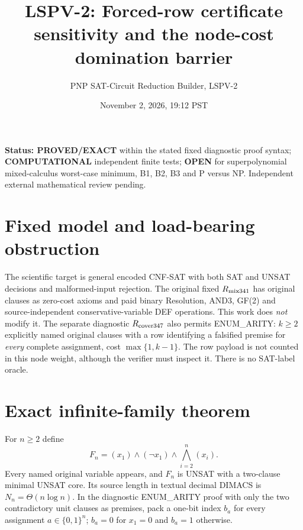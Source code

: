 \documentclass[11pt]{article}
\title{LSPV-2: Forced-row certificate sensitivity and the node-cost domination barrier}
\author{PNP SAT-Circuit Reduction Builder, LSPV-2}
\date{November 2, 2026, 19:12 PST}
\begin{document}
\maketitle
\noindent\textbf{Status: PROVED/EXACT} within the stated fixed diagnostic proof syntax; \textbf{COMPUTATIONAL} independent finite tests; \textbf{OPEN} for superpolynomial mixed-calculus worst-case minimum, B1, B2, B3 and P versus NP. Independent external mathematical review pending.

\section{Fixed model and load-bearing obstruction}
The scientific target is general encoded CNF-SAT with both SAT and UNSAT decisions and malformed-input rejection. The original fixed $R_{\rm mix341}$ has original clauses as zero-cost axioms and paid binary Resolution, AND3, GF(2) and source-independent conservative-variable DEF operations. This work does \emph{not} modify it. The separate diagnostic $R_{\rm cover347}$ also permits ENUM\_ARITY: $k\ge2$ explicitly named original clauses with a row identifying a falsified premise for \emph{every} complete assignment, cost $\max\{1,k-1\}$. The row payload is not counted in this node weight, although the verifier must inspect it. There is no SAT-label oracle.

\section{Exact infinite-family theorem}
For $n\ge2$ define
\[
F_n=(x_1)\land(\neg x_1)\land\bigwedge_{i=2}^n(x_i).
\]
Every named original variable appears, and $F_n$ is UNSAT with a two-clause minimal UNSAT core. Its source length in textual decimal DIMACS is $N_n=\Theta(n\log n)$. In the diagnostic ENUM\_ARITY proof with only the two contradictory unit clauses as premises, pack a one-bit index $b_a$ for every assignment $a\in\{0,1\}^n$; $b_a=0$ for $x_1=0$ and $b_a=1$ otherwise.
\end{document}

